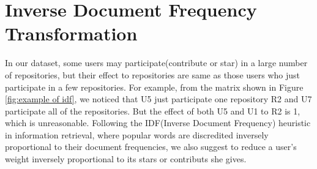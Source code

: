 \documentclass[12pt,oneside,final]{vlsithesis}
\begin{document}
\section{Inverse Document Frequency Transformation}
In our dataset, some users may participate(contribute or star) in a large number of repositories, but their effect to repositories are same as those users who just participate in a few repositories. For example, from the matrix shown in Figure \ref{fig:example of idf}, we noticed that U5 just participate one repository R2 and U7 participate all of the repositories. But the effect of both U5 and U1 to R2 is 1, which is unreasonable. Following the IDF(Inverse Document Frequency) heuristic in information retrieval, where popular words are discredited inversely proportional to their document frequencies, we also suggest to reduce a user's weight inversely proportional to its stars or contributs she gives. 
\begin{figure*}
	\centering
	\caption{Example of IDF transform}
	\label{fig:example of idf}
\end{figure*}
\end{document}
